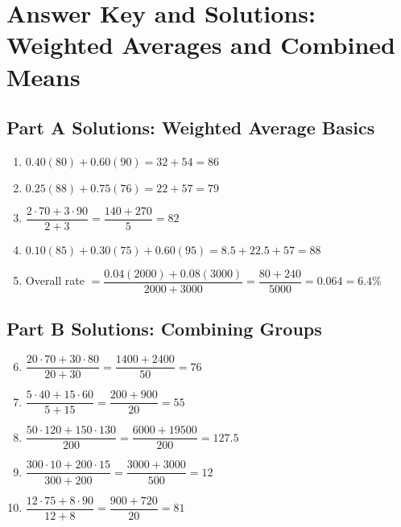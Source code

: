 \documentclass[12pt]{article}
\begin{document}
\newpage


\section*{Answer Key and Solutions: Weighted Averages and Combined Means}

\subsection*{Part A Solutions: Weighted Average Basics}
\begin{enumerate}
  \item \(0.40(80)+0.60(90)=32+54=\boxed{86}\)
  \item \(0.25(88)+0.75(76)=22+57=\boxed{79}\)
  \item \(\dfrac{2\cdot70+3\cdot90}{2+3}=\dfrac{140+270}{5}=\boxed{82}\)
  \item \(0.10(85)+0.30(75)+0.60(95)=8.5+22.5+57=\boxed{88}\)
  \item Overall rate \(=\dfrac{0.04(2000)+0.08(3000)}{2000+3000}=\dfrac{80+240}{5000}=0.064=\boxed{6.4\%}\)
\end{enumerate}

\subsection*{Part B Solutions: Combining Groups}
\begin{enumerate}
  \setcounter{enumi}{5}
  \item \(\dfrac{20\cdot70+30\cdot80}{20+30}=\dfrac{1400+2400}{50}=\boxed{76}\)
  \item \(\dfrac{5\cdot40+15\cdot60}{5+15}=\dfrac{200+900}{20}=\boxed{55}\)
  \item \(\dfrac{50\cdot120+150\cdot130}{200}=\dfrac{6000+19500}{200}=\boxed{127.5}\)
  \item \(\dfrac{300\cdot10+200\cdot15}{300+200}=\dfrac{3000+3000}{500}=\boxed{12}\)
  \item \(\dfrac{12\cdot75+8\cdot90}{12+8}=\dfrac{900+720}{20}=\boxed{81}\)
\end{enumerate}
\end{document}
